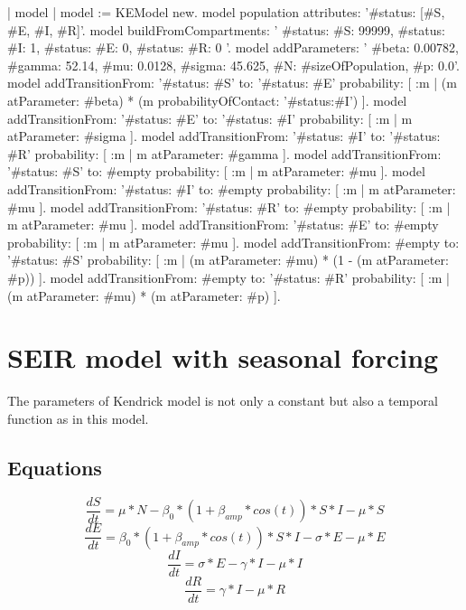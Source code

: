 \documentclass[a4paper,10pt,twoside]{book}
\begin{document}
\begin{code}{}
| model |
	model := KEModel new.
	model population attributes: '{#status: [#S, #E, #I, #R]}'.
	model
		buildFromCompartments:
			'{
		{#status: #S}: 99999,
		{#status: #I}: 1,
		{#status: #E}: 0,
		{#status: #R}: 0
	}'.
	model addParameters: '{
		#beta: 0.00782,
		#gamma: 52.14,
		#mu: 0.0128,
		#sigma: 45.625,
		#N: #sizeOfPopulation,
		#p: 0.0}'.
	model
		addTransitionFrom: '{#status: #S}'
		to: '{#status: #E}'
		probability: [ :m | (m atParameter: #beta) * (m probabilityOfContact: '{#status:#I}') ].
	model
		addTransitionFrom: '{#status: #E}'
		to: '{#status: #I}'
		probability: [ :m | m atParameter: #sigma ].
	model
		addTransitionFrom: '{#status: #I}'
		to: '{#status: #R}'
		probability: [ :m | m atParameter: #gamma ].
	model
		addTransitionFrom: '{#status: #S}'
		to: #empty
		probability: [ :m | m atParameter: #mu ].
	model
		addTransitionFrom: '{#status: #I}'
		to: #empty
		probability: [ :m | m atParameter: #mu ].
	model
		addTransitionFrom: '{#status: #R}'
		to: #empty
		probability: [ :m | m atParameter: #mu ].
	model
		addTransitionFrom: '{#status: #E}'
		to: #empty
		probability: [ :m | m atParameter: #mu ].
	model
		addTransitionFrom: #empty
		to: '{#status: #S}'
		probability: [ :m | (m atParameter: #mu) * (1 - (m atParameter: #p)) ].
	model
		addTransitionFrom: #empty
		to: '{#status: #R}'
		probability: [ :m | (m atParameter: #mu) * (m atParameter: #p) ].
\end{code}

\section{ SEIR model with seasonal forcing}
The parameters of Kendrick model is not only a constant but also a temporal function as in this model.
\subsection{ Equations}

  \begin{equation}
    \frac{dS}{dt} = \mu*N - \beta_0*(1+\beta_{amp}*cos(t))*S*I - \mu*S
  \end{equation}
  \begin{equation}
    \frac{dE}{dt} = \beta_0*(1+\beta_{amp}*cos(t))*S*I - \sigma*E - \mu*E
  \end{equation}
  \begin{equation}
    \frac{dI}{dt} = \sigma*E - \gamma*I - \mu*I
  \end{equation}
  \begin{equation}
    \frac{dR}{dt} = \gamma*I - \mu*R
  \end{equation}
  
\end{document}

